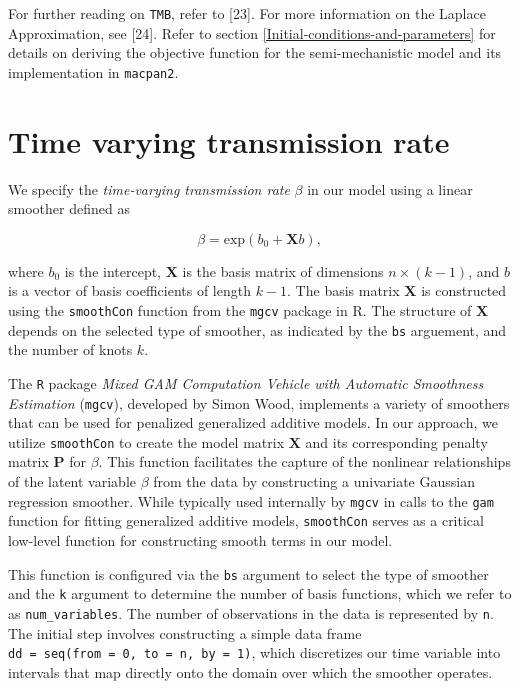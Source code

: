 \documentclass[
11pt, %
oneside, %
english, %
singlespacing, %
]{macthesis} %
\begin{document}
For further reading on \texttt{TMB}, refer to {[}23{]}. For more information on the Laplace Approximation, see {[}24{]}. Refer to section \ref{Initial-conditions-and-parameters} for details on deriving the objective function for the semi-mechanistic model and its implementation in \texttt{macpan2}.

\section{Time varying transmission rate}\label{Time-varying-transmission-rate}

We specify the \emph{time-varying transmission rate} \(\beta\) in our model using a linear smoother defined as

\begin{equation}
\beta = \text{exp}(b_0 + \mathbf{X}b),
\label{eq:linear smoother}
\end{equation}

where \(b_0\) is the intercept, \(\mathbf{X}\) is the basis matrix of dimensions \(n \times (k-1)\), and \(b\) is a vector of basis coefficients of length \(k-1\). The basis matrix \(\mathbf{X}\) is constructed using the \texttt{smoothCon} function from the \texttt{mgcv} package in R. The structure of \(\mathbf{X}\) depends on the selected type of smoother, as indicated by the \texttt{bs} arguement, and the number of knots \(k\).

The \texttt{R} package \emph{Mixed GAM Computation Vehicle with Automatic Smoothness Estimation} (\texttt{mgcv}), developed by Simon Wood, implements a variety of smoothers that can be used for penalized generalized additive models. In our approach, we utilize \texttt{smoothCon} to create the model matrix \(\mathbf{X}\) and its corresponding penalty matrix \(\mathbf{P}\) for \(\beta\). This function facilitates the capture of the nonlinear relationships of the latent variable \(\beta\) from the data by constructing a univariate Gaussian regression smoother. While typically used internally by \texttt{mgcv} in calls to the \texttt{gam} function for fitting generalized additive models, \texttt{smoothCon} serves as a critical low-level function for constructing smooth terms in our model.

This function is configured via the \texttt{bs} argument to select the type of smoother and the \texttt{k} argument to determine the number of basis functions, which we refer to as \texttt{num\_variables}. The number of observations in the data is represented by \texttt{n}. The initial step involves constructing a simple data frame \texttt{dd\ =\ seq(from\ =\ 0,\ to\ =\ n,\ by\ =\ 1)}, which discretizes our time variable into intervals that map directly onto the domain over which the smoother operates.
\end{document}
